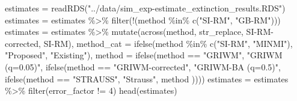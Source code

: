 \documentclass[
]{article}
\newenvironment{Shaded}{\begin{snugshade}}{\end{snugshade}}
\newcommand{\AttributeTok}[1]{\textcolor[rgb]{0.77,0.63,0.00}{#1}}
\newcommand{\DecValTok}[1]{\textcolor[rgb]{0.00,0.00,0.81}{#1}}
\newcommand{\FunctionTok}[1]{\textcolor[rgb]{0.00,0.00,0.00}{#1}}
\newcommand{\NormalTok}[1]{#1}
\newcommand{\OtherTok}[1]{\textcolor[rgb]{0.56,0.35,0.01}{#1}}
\newcommand{\SpecialCharTok}[1]{\textcolor[rgb]{0.00,0.00,0.00}{#1}}
\newcommand{\StringTok}[1]{\textcolor[rgb]{0.31,0.60,0.02}{#1}}
\begin{document}
\begin{Shaded}
\begin{Highlighting}[]
\NormalTok{estimates }\OtherTok{=} \FunctionTok{readRDS}\NormalTok{(}\StringTok{"../data/sim\_exp{-}estimate\_extinction\_results.RDS"}\NormalTok{)}
\NormalTok{estimates }\OtherTok{=}\NormalTok{ estimates }\SpecialCharTok{\%\textgreater{}\%} \FunctionTok{filter}\NormalTok{(}\SpecialCharTok{!}\NormalTok{(method }\SpecialCharTok{\%in\%} \FunctionTok{c}\NormalTok{(}\StringTok{"SI{-}RM"}\NormalTok{, }\StringTok{"GB{-}RM"}\NormalTok{)))}
\NormalTok{estimates }\OtherTok{=}\NormalTok{ estimates }\SpecialCharTok{\%\textgreater{}\%} \FunctionTok{mutate}\NormalTok{(}\FunctionTok{across}\NormalTok{(method, str\_replace, }\StringTok{\textquotesingle{}SI{-}RM{-}corrected\textquotesingle{}}\NormalTok{, }\StringTok{\textquotesingle{}SI{-}RM\textquotesingle{}}\NormalTok{),}
                                 \AttributeTok{method\_cat =} \FunctionTok{ifelse}\NormalTok{(method }\SpecialCharTok{\%in\%} \FunctionTok{c}\NormalTok{(}\StringTok{"SI{-}RM"}\NormalTok{, }\StringTok{"MINMI"}\NormalTok{),}
                                                     \StringTok{"Proposed"}\NormalTok{,}
                                                     \StringTok{"Existing"}\NormalTok{),}
                                 \AttributeTok{method =} \FunctionTok{ifelse}\NormalTok{(method }\SpecialCharTok{==} \StringTok{"GRIWM"}\NormalTok{,}
                                                 \StringTok{"GRIWM (q=0.05)"}\NormalTok{,}
                                                 \FunctionTok{ifelse}\NormalTok{(method }\SpecialCharTok{==} \StringTok{"GRIWM{-}corrected"}\NormalTok{,}
                                                        \StringTok{"GRIWM{-}BA (q=0.5)"}\NormalTok{,}
                                                        \FunctionTok{ifelse}\NormalTok{(method }\SpecialCharTok{==} \StringTok{"STRAUSS"}\NormalTok{,}
                                                          \StringTok{"Strauss"}\NormalTok{,}
\NormalTok{                                                          method}
\NormalTok{                                                        ))))}
\NormalTok{estimates }\OtherTok{=}\NormalTok{ estimates }\SpecialCharTok{\%\textgreater{}\%} \FunctionTok{filter}\NormalTok{(error\_factor }\SpecialCharTok{!=} \DecValTok{4}\NormalTok{)}
\FunctionTok{head}\NormalTok{(estimates)}
\end{Highlighting}
\end{Shaded}
\end{document}

